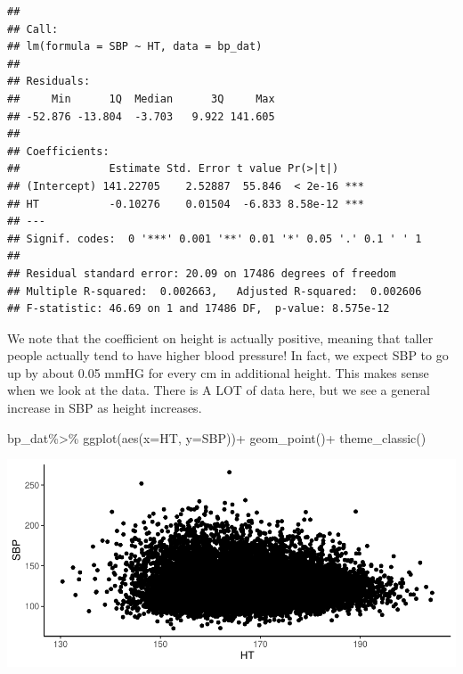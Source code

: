 \documentclass[
]{book}
\newenvironment{Shaded}{\begin{snugshade}}{\end{snugshade}}
\newcommand{\AttributeTok}[1]{\textcolor[rgb]{0.77,0.63,0.00}{#1}}
\newcommand{\FunctionTok}[1]{\textcolor[rgb]{0.00,0.00,0.00}{#1}}
\newcommand{\NormalTok}[1]{#1}
\newcommand{\SpecialCharTok}[1]{\textcolor[rgb]{0.00,0.00,0.00}{#1}}
\newcommand{\StringTok}[1]{\textcolor[rgb]{0.31,0.60,0.02}{#1}}
\begin{document}
\begin{verbatim}
## 
## Call:
## lm(formula = SBP ~ HT, data = bp_dat)
## 
## Residuals:
##     Min      1Q  Median      3Q     Max 
## -52.876 -13.804  -3.703   9.922 141.605 
## 
## Coefficients:
##              Estimate Std. Error t value Pr(>|t|)    
## (Intercept) 141.22705    2.52887  55.846  < 2e-16 ***
## HT           -0.10276    0.01504  -6.833 8.58e-12 ***
## ---
## Signif. codes:  0 '***' 0.001 '**' 0.01 '*' 0.05 '.' 0.1 ' ' 1
## 
## Residual standard error: 20.09 on 17486 degrees of freedom
## Multiple R-squared:  0.002663,   Adjusted R-squared:  0.002606 
## F-statistic: 46.69 on 1 and 17486 DF,  p-value: 8.575e-12
\end{verbatim}

We note that the coefficient on height is actually positive, meaning that taller people actually tend to have higher blood pressure! In fact, we expect SBP to go up by about 0.05 mmHG for every cm in additional height. This makes sense when we look at the data. There is A LOT of data here, but we see a general increase in SBP as height increases.

\begin{Shaded}
\begin{Highlighting}[]
\NormalTok{bp\_dat}\SpecialCharTok{\%\textgreater{}\%}
  \FunctionTok{ggplot}\NormalTok{(}\FunctionTok{aes}\NormalTok{(}\AttributeTok{x=}\StringTok{\textasciigrave{}}\AttributeTok{HT}\StringTok{\textasciigrave{}}\NormalTok{,}
             \AttributeTok{y=}\StringTok{\textasciigrave{}}\AttributeTok{SBP}\StringTok{\textasciigrave{}}\NormalTok{))}\SpecialCharTok{+}
  \FunctionTok{geom\_point}\NormalTok{()}\SpecialCharTok{+}
  \FunctionTok{theme\_classic}\NormalTok{()}
\end{Highlighting}
\end{Shaded}

\includegraphics{MA206supplement_files/figure-latex/unnamed-chunk-4-1.pdf}
\end{document}
